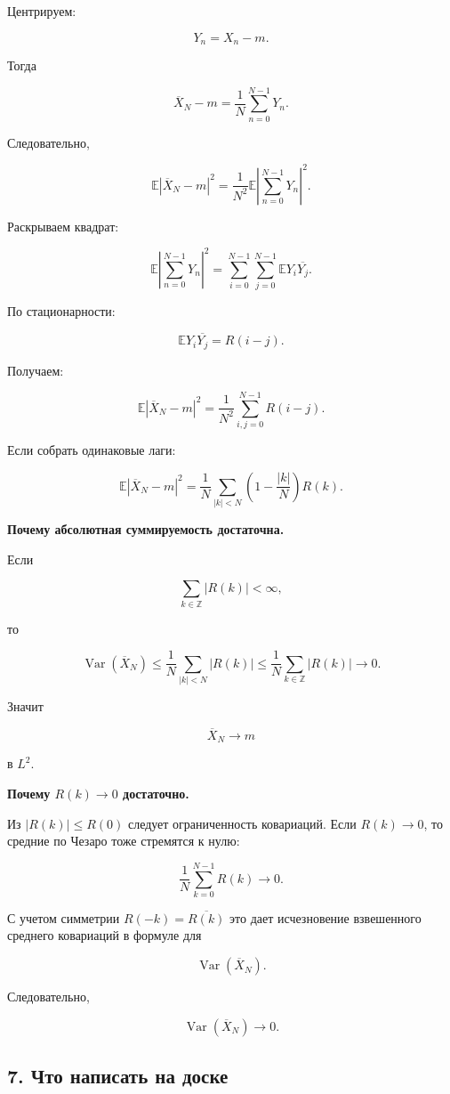 \documentclass[
  11pt,
  a4paper,
]{article}
\begin{document}
Центрируем:

\[
Y_n=X_n-m.
\]

Тогда

\[
\overline X_N-m=\frac1N\sum_{n=0}^{N-1}Y_n.
\]

Следовательно,

\[
\mathbb E|\overline X_N-m|^2
=
\frac1{N^2}
\mathbb E
\left|
\sum_{n=0}^{N-1}Y_n
\right|^2.
\]

Раскрываем квадрат:

\[
\mathbb E
\left|
\sum_{n=0}^{N-1}Y_n
\right|^2
=
\sum_{i=0}^{N-1}\sum_{j=0}^{N-1}
\mathbb E Y_i\overline{Y_j}.
\]

По стационарности:

\[
\mathbb E Y_i\overline{Y_j}=R(i-j).
\]

Получаем:

\[
\mathbb E|\overline X_N-m|^2
=
\frac1{N^2}
\sum_{i,j=0}^{N-1}R(i-j).
\]

Если собрать одинаковые лаги:

\[
\mathbb E|\overline X_N-m|^2
=
\frac1N
\sum_{|k|<N}
\left(1-\frac{|k|}{N}\right)R(k).
\]

\textbf{Почему абсолютная суммируемость достаточна.}

Если

\[
\sum_{k\in\mathbb Z}|R(k)|<\infty,
\]

то

\[
\operatorname{Var}(\overline X_N)
\le
\frac1N
\sum_{|k|<N}|R(k)|
\le
\frac1N
\sum_{k\in\mathbb Z}|R(k)|
\to0.
\]

Значит

\[
\overline X_N\to m
\]

в \(L^2\).

\textbf{Почему \(R(k)\to0\) достаточно.}

Из \(|R(k)|\le R(0)\) следует ограниченность ковариаций. Если
\(R(k)\to0\), то средние по Чезаро тоже стремятся к нулю:

\[
\frac1N\sum_{k=0}^{N-1}R(k)\to0.
\]

С учетом симметрии \(R(-k)=\overline{R(k)}\) это дает исчезновение
взвешенного среднего ковариаций в формуле для

\[
\operatorname{Var}(\overline X_N).
\]

Следовательно,

\[
\operatorname{Var}(\overline X_N)\to0.
\]

\subsection{7. Что написать на
доске}\label{ux447ux442ux43e-ux43dux430ux43fux438ux441ux430ux442ux44c-ux43dux430-ux434ux43eux441ux43aux435}
\end{document}
